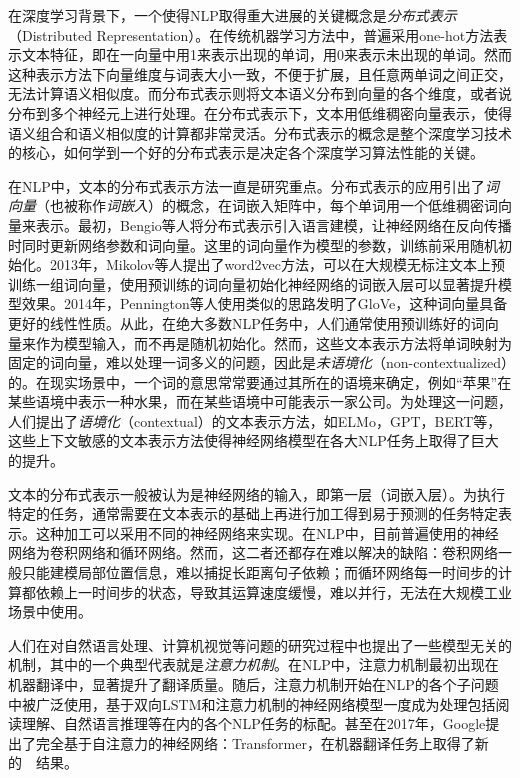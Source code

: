 在深度学习背景下，一个使得NLP取得重大进展的关键概念是\emph{分布式表示}（Distributed Representation）\cite{Hinton:1986:DR:104279.104287}。在传统机器学习方法中，普遍采用one-hot方法表示文本特征，即在一向量中用1来表示出现的单词，用0来表示未出现的单词。然而这种表示方法下向量维度与词表大小一致，不便于扩展，且任意两单词之间正交，无法计算语义相似度。而分布式表示则将文本语义分布到向量的各个维度，或者说分布到多个神经元上进行处理。在分布式表示下，文本用低维稠密向量表示，使得语义组合和语义相似度的计算都非常灵活。分布式表示的概念是整个深度学习技术的核心，如何学到一个好的分布式表示是决定各个深度学习算法性能的关键。

在NLP中，文本的分布式表示方法一直是研究重点。分布式表示的应用引出了\emph{词向量}（也被称作\emph{词嵌入}）的概念，在词嵌入矩阵中，每个单词用一个低维稠密词向量来表示。最初，Bengio等人\cite{DBLP:conf/nips/BengioDV00}将分布式表示引入语言建模，让神经网络在反向传播时同时更新网络参数和词向量。这里的词向量作为模型的参数，训练前采用随机初始化。2013年，Mikolov等人\cite{DBLP:conf/nips/MikolovSCCD13}提出了word2vec方法，可以在大规模无标注文本上预训练一组词向量，使用预训练的词向量初始化神经网络的词嵌入层可以显著提升模型效果。2014年，Pennington等人\cite{DBLP:conf/emnlp/PenningtonSM14}使用类似的思路发明了GloVe，这种词向量具备更好的线性性质。从此，在绝大多数NLP任务中，人们通常使用预训练好的词向量来作为模型输入，而不再是随机初始化。然而，这些文本表示方法将单词映射为固定的词向量，难以处理一词多义的问题，因此是\emph{未语境化}（non-contextualized）的。在现实场景中，一个词的意思常常要通过其所在的语境来确定，例如“苹果”在某些语境中表示一种水果，而在某些语境中可能表示一家公司。为处理这一问题，人们提出了\emph{语境化}（contextual）的文本表示方法，如ELMo\cite{DBLP:conf/naacl/PetersNIGCLZ18}，GPT\cite{radford2018improving}，BERT\cite{devlin2018bert}等，这些上下文敏感的文本表示方法使得神经网络模型在各大NLP任务上取得了巨大的提升。

文本的分布式表示一般被认为是神经网络的输入，即第一层（词嵌入层）。为执行特定的任务，通常需要在文本表示的基础上再进行加工得到易于预测的任务特定表示。这种加工可以采用不同的神经网络来实现。在NLP中，目前普遍使用的神经网络为卷积网络\cite{DBLP:conf/icml/CollobertW08}\cite{DBLP:conf/emnlp/Kim14}\cite{DBLP:conf/icml/GehringAGYD17}和循环网络\cite{DBLP:conf/interspeech/MikolovKBCK10}\cite{DBLP:conf/emnlp/WenGMSVY15}\cite{DBLP:conf/acl/MaH16}。然而，这二者还都存在难以解决的缺陷：卷积网络一般只能建模局部位置信息，难以捕捉长距离句子依赖；而循环网络每一时间步的计算都依赖上一时间步的状态，导致其运算速度缓慢，难以并行，无法在大规模工业场景中使用。

人们在对自然语言处理、计算机视觉等问题的研究过程中也提出了一些模型无关的机制，其中的一个典型代表就是\emph{注意力机制}。在NLP中，注意力机制最初出现在机器翻译中，显著提升了翻译质量\cite{DBLP:journals/corr/BahdanauCB14}。随后，注意力机制开始在NLP的各个子问题中被广泛使用，基于双向LSTM和注意力机制的神经网络模型一度成为处理包括阅读理解、自然语言推理等在内的各个NLP任务的标配。甚至在2017年，Google提出了完全基于自注意力的神经网络：Transformer\cite{DBLP:conf/nips/VaswaniSPUJGKP17}，在机器翻译任务上取得了新的~\sArt~结果。

